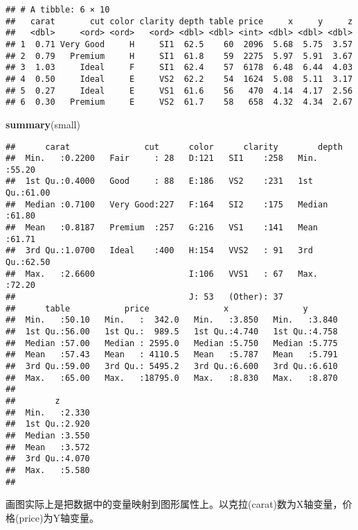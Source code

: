 \documentclass[]{article}
\newenvironment{Shaded}{\begin{snugshade}}{\end{snugshade}}
\newcommand{\KeywordTok}[1]{\textcolor[rgb]{0.13,0.29,0.53}{\textbf{#1}}}
\newcommand{\NormalTok}[1]{#1}
\begin{document}
\begin{verbatim}
## # A tibble: 6 × 10
##   carat       cut color clarity depth table price     x     y     z
##   <dbl>     <ord> <ord>   <ord> <dbl> <dbl> <int> <dbl> <dbl> <dbl>
## 1  0.71 Very Good     H     SI1  62.5    60  2096  5.68  5.75  3.57
## 2  0.79   Premium     H     SI1  61.8    59  2275  5.97  5.91  3.67
## 3  1.03     Ideal     F     SI1  62.4    57  6178  6.48  6.44  4.03
## 4  0.50     Ideal     E     VS2  62.2    54  1624  5.08  5.11  3.17
## 5  0.27     Ideal     E     VS1  61.6    56   470  4.14  4.17  2.56
## 6  0.30   Premium     E     VS2  61.7    58   658  4.32  4.34  2.67
\end{verbatim}

\begin{Shaded}
\begin{Highlighting}[]
\KeywordTok{summary}\NormalTok{(small)}
\end{Highlighting}
\end{Shaded}

\begin{verbatim}
##      carat               cut      color      clarity        depth      
##  Min.   :0.2200   Fair     : 28   D:121   SI1    :258   Min.   :55.20  
##  1st Qu.:0.4000   Good     : 88   E:186   VS2    :231   1st Qu.:61.00  
##  Median :0.7100   Very Good:227   F:164   SI2    :175   Median :61.80  
##  Mean   :0.8187   Premium  :257   G:216   VS1    :141   Mean   :61.71  
##  3rd Qu.:1.0700   Ideal    :400   H:154   VVS2   : 91   3rd Qu.:62.50  
##  Max.   :2.6600                   I:106   VVS1   : 67   Max.   :72.20  
##                                   J: 53   (Other): 37                  
##      table           price               x               y        
##  Min.   :50.10   Min.   :  342.0   Min.   :3.850   Min.   :3.840  
##  1st Qu.:56.00   1st Qu.:  989.5   1st Qu.:4.740   1st Qu.:4.758  
##  Median :57.00   Median : 2595.0   Median :5.750   Median :5.775  
##  Mean   :57.43   Mean   : 4110.5   Mean   :5.787   Mean   :5.791  
##  3rd Qu.:59.00   3rd Qu.: 5495.2   3rd Qu.:6.600   3rd Qu.:6.610  
##  Max.   :65.00   Max.   :18795.0   Max.   :8.830   Max.   :8.870  
##                                                                   
##        z        
##  Min.   :2.330  
##  1st Qu.:2.920  
##  Median :3.550  
##  Mean   :3.572  
##  3rd Qu.:4.070  
##  Max.   :5.580  
## 
\end{verbatim}

画图实际上是把数据中的变量映射到图形属性上。以克拉(carat)数为X轴变量，价格(price)为Y轴变量。
\end{document}
